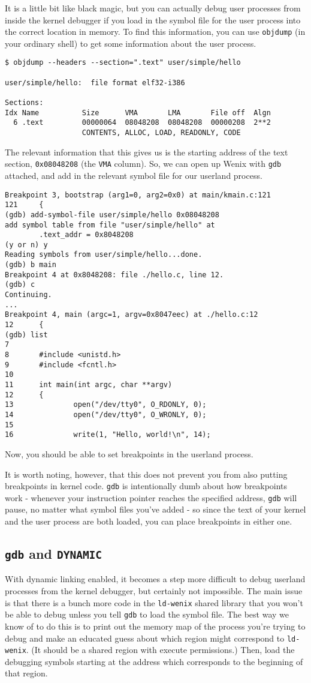 It is a little bit like black magic, but you can actually debug user processes from inside the kernel debugger if you load in the symbol file for the user process into the correct location in memory. To find this information, you can use \texttt{objdump} (in your ordinary shell) to get some information about the user process.
\begin{verbatim}
$ objdump --headers --section=".text" user/simple/hello

user/simple/hello:  file format elf32-i386

Sections:
Idx Name          Size      VMA       LMA       File off  Algn
  6 .text         00000064  08048208  08048208  00000208  2**2
                  CONTENTS, ALLOC, LOAD, READONLY, CODE\end{verbatim}
The relevant information that this gives us is the starting address of the text section, \texttt{0x08048208} (the \texttt{VMA} column). So, we can open up Wenix with \texttt{gdb} attached, and add in the relevant symbol file for our userland process.
\begin{verbatim}
Breakpoint 3, bootstrap (arg1=0, arg2=0x0) at main/kmain.c:121
121     {
(gdb) add-symbol-file user/simple/hello 0x08048208
add symbol table from file "user/simple/hello" at
        .text_addr = 0x8048208
(y or n) y
Reading symbols from user/simple/hello...done.
(gdb) b main
Breakpoint 4 at 0x8048208: file ./hello.c, line 12.
(gdb) c
Continuing.
...
Breakpoint 4, main (argc=1, argv=0x8047eec) at ./hello.c:12
12      {
(gdb) list
7
8       #include <unistd.h>
9       #include <fcntl.h>
10
11      int main(int argc, char **argv)
12      {
13              open("/dev/tty0", O_RDONLY, 0);
14              open("/dev/tty0", O_WRONLY, 0);
15
16              write(1, "Hello, world!\n", 14);\end{verbatim}
Now, you should be able to set breakpoints in the userland process.

It is worth noting, however, that this does not prevent you from also putting breakpoints in kernel code. \texttt{gdb} is intentionally dumb about how breakpoints work - whenever your instruction pointer reaches the specified address, \texttt{gdb} will pause, no matter what symbol files you've added - so since the text of your kernel and the user process are both loaded, you can place breakpoints in either one.

\subsection{\texttt{gdb} and \texttt{DYNAMIC}}

With dynamic linking enabled, it becomes a step more difficult to debug userland processes from the kernel debugger, but certainly not impossible. The main issue is that there is a bunch more code in the \texttt{ld-wenix} shared library that you won't be able to debug unless you tell \texttt{gdb} to load the symbol file. The best way we know of to do this is to print out the memory map of the process you're trying to debug and make an educated guess about which region might correspond to \texttt{ld-wenix}. (It should be a shared region with execute permissions.) Then, load the debugging symbols starting at the address which corresponds to the beginning of that region.
